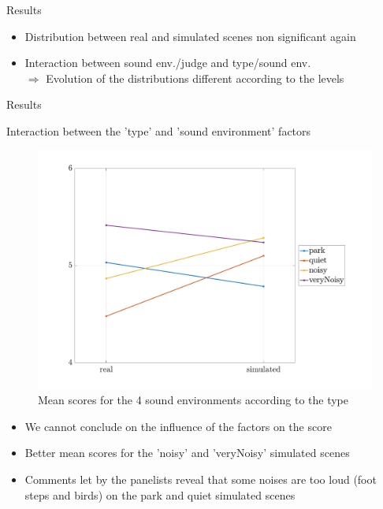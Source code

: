 \documentclass{beamer}
\begin{document}
\begin{frame}{Results}
\begin{itemize}
\footnotesize
	\item Distribution between real and simulated scenes non significant again
	\item Interaction between sound env./judge and type/sound env.\\
	$\Rightarrow$ Evolution of the distributions different according to the levels
\end{itemize}

\end{frame}


\begin{frame}{Results}
\begin{block}{Interaction between the 'type' and 'sound environment' factors}
\begin{minipage}[l]{0.5\linewidth}
\begin{figure}[hbtp]
\centering
\includegraphics[width=\textwidth]{pictures/testPerceptif_interactionAmbianceCOLOR_EN.pdf}
\caption{Mean scores for the 4 sound environments according to the type}
\end{figure}
\end{minipage}%
\begin{minipage}[c]{0.5\linewidth}
\begin{itemize}
\footnotesize
	\item We cannot conclude on the influence of the factors on the score
	\item Better mean scores for the 'noisy' and 'veryNoisy' simulated scenes
	\item Comments let by the panelists reveal that some noises are too loud (foot steps and birds) on the park and quiet simulated scenes
\end{itemize}

\end{minipage}
\end{block}

\end{frame}
\end{document}
